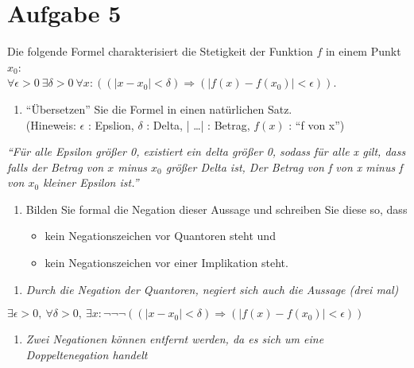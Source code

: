 \section*{Aufgabe 5}

Die folgende Formel charakterisiert die Stetigkeit der Funktion $f$ in einem Punkt $x_0$:\\
$\forall \epsilon > 0 \ \exists \delta > 0 \ \forall  x : ((| x - x_0 | < \delta) \Rightarrow (| f(x) - f(x_0)| < \epsilon))$.

\begin{enumerate}[label={a)}, leftmargin=*]
\item ``Übersetzen'' Sie die Formel in einen natürlichen Satz.\\
(Hineweis: $\epsilon$ : Epslion, $\delta$ : Delta, | \dots | : Betrag, $f(x)$ : ``f von x'')
\end{enumerate}

\textit{``Für alle Epsilon größer 0, existiert ein delta größer 0, sodass für alle x gilt, dass falls der Betrag von $x$ minus $x_0$ größer Delta ist, Der Betrag von f von x minus f von $x_0$ kleiner Epsilon ist.''}

\begin{enumerate}[label={b)}, leftmargin=*]
\item Bilden Sie formal die Negation dieser Aussage und schreiben Sie diese so, dass
\begin{itemize}
\item kein Negationszeichen vor Quantoren steht und
\item kein Negationszeichen vor einer Implikation steht.
\end{itemize}
\end{enumerate}

\begin{enumerate}[leftmargin=*]
\item \textit{Durch die Negation der Quantoren, negiert sich auch die Aussage (drei mal)}
\end{enumerate}

\begin{center}
$\exists \epsilon > 0, \ \forall \delta > 0, \ \exists x : \lnot \lnot \lnot((| x - x_0 | < \delta) \Rightarrow (| f(x) - f(x_0)| < \epsilon))$
\end{center}

\begin{enumerate}[label={2.}, leftmargin=*]
\item \textit{Zwei Negationen können entfernt werden, da es sich um eine Doppeltenegation handelt}
\end{enumerate}

